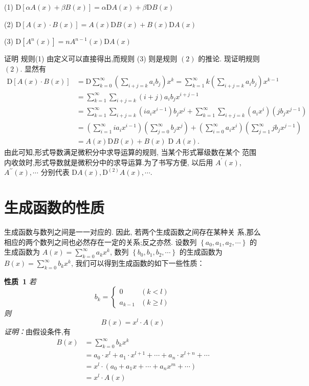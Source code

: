 \documentclass{report}
\begin{document}
(1) $\mathrm{D}[\alpha A(x)+\beta B(x)]=\alpha \mathrm{D} A(x)+\beta \mathrm{D} B(x)$

(2) $\mathrm{D}[A(x) \cdot B(x)]=A(x) \mathrm{D} B(x)+B(x) \mathrm{D} A(x)$

(3) $\mathrm{D}\left[A^{n}(x)\right]=n A^{n-1}(x) \mathrm{D} A(x)$

证明 规则(1) 由定义可以直接得出,而规则 (3) 则是规则 $(2)$ 的推论. 现证明规则 $(2)$. 显然有
$$
\begin{aligned}
\mathrm{D}[A(x) \cdot B(x)] &=\mathrm{D} \sum_{k=0}^{\infty}\left(\sum_{i+j=k} a_{i} b_{j}\right) x^{k}=\sum_{k=1}^{\infty} k\left(\sum_{i+j=k} a_{i} b_{j}\right) x^{k-1} \\
&=\sum_{k=1}^{\infty} \sum_{i+j=k}(i+j) a_{i} b_{j} x^{i+j-1} \\
&=\sum_{k=1}^{\infty} \sum_{i+j=k}\left(i a_{i} x^{i-1}\right) b_{j} x^{j}+\sum_{k=1}^{\infty} \sum_{i+j=k}\left(a_{i} x^{i}\right)\left(j b_{j} x^{j-1}\right) \\
&=\left(\sum_{i=1}^{\infty} i a_{i} x^{i-1}\right)\left(\sum_{j=0}^{\infty} b_{j} x^{j}\right)+\left(\sum_{i=0}^{\infty} a_{i} x^{i}\right)\left(\sum_{j=1}^{\infty} j b_{j} x^{j-1}\right) \\
&=A(x) \mathrm{D} B(x)+B(x) \operatorname{D} A(x) .
\end{aligned}
$$
由此可知,形式导数满足微积分中求导运算的规则, 当某个形式幂级数在某个 范围内收敛时,形式导数就是微积分中的求导运算.为了书写方便, 以后用 $A^{\prime}(x)$, $A^{\prime \prime}(x), \cdots$ 分别代表 $\mathrm{D} A(x), \mathrm{D}^{(2)} A(x), \cdots .$

\section{生成函数的性质}
生成函数与数列之间是一一对应的. 因此, 若两个生成函数之间存在某种关 系,那么相应的两个数列之间也必然存在一定的关系;反之亦然.
设数列 $\left\{a_{0}, a_{1}, a_{2}, \cdots\right\}$ 的生成函数为 $A(x)=\sum_{k=0}^{\infty} a_{k} x^{k}$, 数列 $\left\{b_{0}, b_{1}, b_{2}, \cdots\right\}$
的生成函数为 $B(x)=\sum_{k=0}^{\infty} b_{k} x^{k}$, 我们可以得到生成函数的如下一些性质：

\noindent
\textbf{性质\ 1} \textsl{若
$$
b_{k}=\left\{\begin{array}{ll}
0 & (k<l) \\ a_{k-1} & (k \geqslant l)
\end{array}\right.
$$
则
$$
B(x)=x^{l} \cdot A(x)
$$
证明：}由假设条件,有
$$
\begin{aligned}
B(x) &=\sum_{k=0}^{\infty} b_{k} x^{k} \\
&=a_{0} \cdot x^{l}+a_{1} \cdot x^{l+1}+\cdots+a_{n} \cdot x^{l+n}+\cdots \\
&=x^{l} \cdot\left(a_{0}+a_{1} x+\cdots+a_{n} x^{m}+\cdots\right) \\
&=x^{l} \cdot A(x)
\end{aligned}
$$
\end{document}
